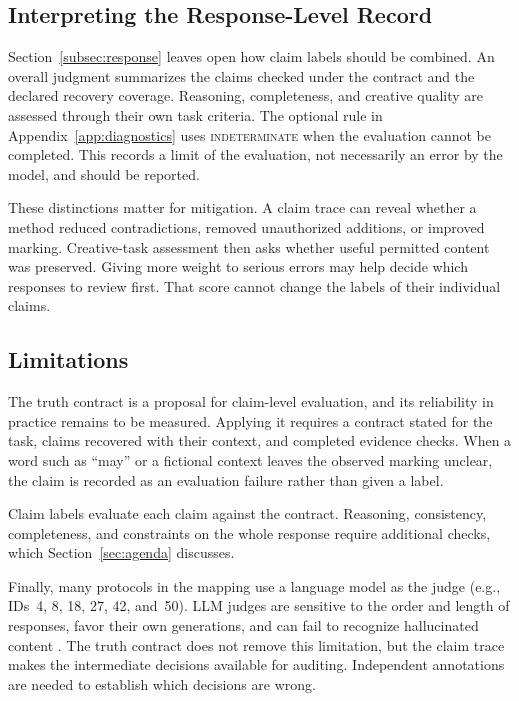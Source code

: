 \documentclass{clv2025}
\begin{document}
\subsection{Interpreting the Response-Level Record}

Section~\ref{subsec:response} leaves open how claim labels should be combined.
An overall judgment summarizes the claims checked under the contract and
the declared recovery coverage. Reasoning, completeness, and creative
quality are assessed through their own task criteria. The optional rule in
Appendix~\ref{app:diagnostics} uses \textsc{indeterminate} when the evaluation
cannot be completed. This records a limit of the evaluation, not necessarily
an error by the model, and should be reported.

These distinctions matter for mitigation. A claim trace can reveal whether a
method reduced contradictions, removed unauthorized additions, or improved
marking. Creative-task assessment then asks whether useful permitted content
was preserved. Giving more weight to serious errors may help decide which
responses to review first. That score cannot change the labels of their
individual claims.

\subsection{Limitations}

The truth contract is a proposal for claim-level evaluation, and its
reliability in practice remains to be measured. Applying it requires a
contract stated for the task, claims recovered with their context, and
completed evidence checks. When a word such as ``may'' or a fictional
context leaves the observed marking unclear, the claim is recorded as an
evaluation failure rather than given a label.

Claim labels evaluate each claim against the contract. Reasoning,
consistency, completeness, and constraints on the whole response require
additional checks, which Section~\ref{sec:agenda} discusses.

Finally, many protocols in the mapping use a language model as the judge
(e.g., IDs~4, 8, 18, 27, 42, and~50). LLM judges are sensitive to the order
and length of responses, favor their own generations, and can fail to
recognize hallucinated content
\citep{wang_fair_2024,zheng_judging_2023,panickssery_llm_2024,li_halueval_2023,gu_survey_2024}.
The truth contract does not remove this limitation, but the claim trace
makes the intermediate decisions available for auditing. Independent
annotations are needed to establish which decisions are wrong.
\end{document}
